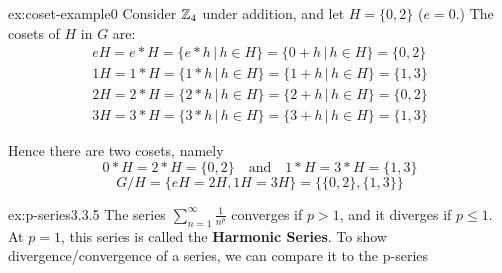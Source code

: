 \documentclass[landscape, 8pt]{extarticle}
\begin{document}
\begin{multicols}{3}

\begin{xmp}{ex:coset-example}{0}
    Consider $\mathbb{Z}_{4}$ under addition, and let $H=\{0,2\}$ ($e=0$.) The cosets of $H$ in $G$ are:
    \[\begin{aligned}
    eH = e * H = \{e * h\,|\,h\in H\} = \{0+h\,|\, h\in H\} = \{0,2\} \\
    1H = 1 * H = \{1 * h\,|\,h\in H\} = \{1+h\,|\, h\in H\} = \{1,3\} \\
    2H = 2 * H = \{2 * h\,|\,h\in H\} = \{2+h\,|\, h\in H\} = \{0,2\} \\
    3H = 3 * H = \{3 * h\,|\,h\in H\} = \{3+h\,|\, h\in H\} = \{1,3\}
    \end{aligned}\]

    Hence there are two cosets, namely
    \[0 * H=2 * H=\{0,2\} \quad\text{and}\quad 1 * H=3 * H=\{1,3\}\]
    \[G/H=\{eH=2H,1H=3H\} = \{\{0,2\}, \{1,3\}\}\]
\end{xmp}
\vspace{-5pt}

\begin{xmp}[p-series]{ex:p-series}{3.3.5}
The series $\displaystyle\sum_{n=1}^{\infty} \frac{1}{n^{p}}$ converges if $p > 1$, and it diverges if $p \le 1$. At $p = 1$, this series is called the \textbf{Harmonic Series}.
\vspace{0pt}\newline
To show divergence/convergence of a series, we can compare it to the p-series

\end{xmp}
\vspace{-5pt}


\end{multicols}
\end{document}

